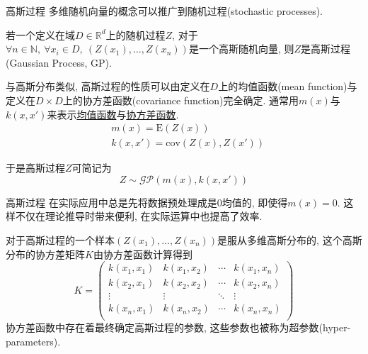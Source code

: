\begin{frame}[fragile]{高斯过程}
    多维随机向量的概念可以推广到随机过程(stochastic processes).

    \begin{definition}[高斯过程]
        \vspace{2ex}  
        若一个定义在域$D\in\mathds{R}^{d}$上的随机过程$Z$, 对于$\forall n\in \mathds{N},\ \forall x_{i}\in D,\ (Z(x_{1}),\dots,Z(x_{n}))$是一个高斯随机向量, 则$Z$是高斯过程(Gaussian Process, GP).
    \end{definition}

    与高斯分布类似, 高斯过程的性质可以由定义在$D$上的均值函数(mean function)与定义在$D\times D$上的协方差函数(covariance function)完全确定. 通常用$m(x)$与$k(x,x')$来表示\uline{均值函数}与\uline{协方差函数}. 
    \begin{align}
        &m(x)=\mathrm{E}(Z(x)) \\
        &k(x,x')=\mathrm{cov}(Z(x),Z(x'))
    \end{align}
    
    于是高斯过程$Z$可简记为
    \begin{equation*}
        Z\sim\mathcal{GP}\left(m(x),k(x,x')\right)
    \end{equation*}

\end{frame}

\begin{frame}[fragile]{高斯过程}
    在实际应用中总是先将数据预处理成是$0$均值的, 即使得$m(x)=0$. 这样不仅在理论推导时带来便利, 在实际运算中也提高了效率. 

    对于高斯过程的一个样本$(Z(x_{1}),\dots,Z(x_{n}))$是服从多维高斯分布的, 这个高斯分布的协方差矩阵$K$由协方差函数计算得到
    \begin{equation}
        K= \begin{pmatrix}
                    k(x_{1},x_{1}) & k(x_{1},x_{2}) & \cdots & k(x_{1},x_{n}) \\
                    k(x_{2},x_{1}) & k(x_{2},x_{2}) & \cdots & k(x_{2},x_{n}) \\
                    \vdots         & \vdots         & \ddots & \vdots \\
                    k(x_{n},x_{1}) & k(x_{n},x_{2}) & \cdots & k(x_{n},x_{n}) \\
                \end{pmatrix}
    \end{equation}
    协方差函数中存在着最终确定高斯过程的参数, 这些参数也被称为超参数(hyper-parameters).
\end{frame}

